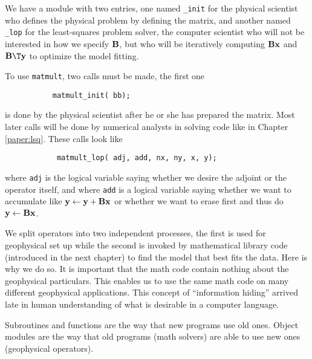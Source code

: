 We have a module with two entries,
one named {\tt \_init} 
for the physical scientist who defines the physical problem by
defining the matrix, and
another named {\tt \_lop} 
for the least-squares problem solver,
the computer scientist who will not be interested
in how we specify $\bold B$, but who will be iteratively computing
$\bold B\bold x$ and $\bold B\T \bold y$
to optimize the model fitting.
\begin{comment}
The lines beginning with {\tt {\#}{\%}} are expanded by Loptran into
more verbose and distracting Fortran 90 code.
The second line in the module \texttt{matmult},
however,
is pure Fortran syntax saying that
{\tt bb} is a pointer to a real-valued matrix.
\end{comment}
\par
To use \texttt{matmult}, two calls must be made,
the first one
\begin{verbatim}
           matmult_init( bb);
\end{verbatim}
is done by the physical scientist after he or she has prepared the matrix.
Most later calls will be done by numerical analysts
in solving code like in Chapter \ref{paper:lsq}.
These calls look like
\begin{verbatim}
            matmult_lop( adj, add, nx, ny, x, y);
\end{verbatim}
where {\tt adj} is the logical variable saying whether we desire
the adjoint or the operator itself,
and where {\tt add} is a logical variable saying
whether we want to accumulate like
$\bold y \leftarrow \bold y+\bold B\bold x$
or whether we want to erase first and thus do
$\bold y \leftarrow \bold B\bold x$.
\begin{comment}
The return value {\tt stat} is an integer parameter,
mostly useless (unless you want to use it for error codes). 
\par
Operator initialization often allocates memory.
To release this memory, you can {\tt call matmult\_close()}
although in this case nothing really happens.
\end{comment}
\par
We split operators into two independent processes,
the first is used for geophysical set up
while the second is invoked by mathematical library code
(introduced in the next chapter)
to find the model that best fits the data.
Here is why we do so.
It is important that the math code contain nothing about
the geophysical particulars.  This enables us to use
the same math code on many different geophysical applications.
This concept of ``information hiding'' arrived late in
human understanding of what is desirable in a computer language.
\begin{comment}
This feature alone is valuable enough to warrant
upgrading from Fortran 77 to Fortran 90, and likewise from C to C++.
\end{comment}
Subroutines and functions are the way that new programs use old ones.
Object modules are the way that old programs (math solvers)
are able to use new ones (geophysical operators).


